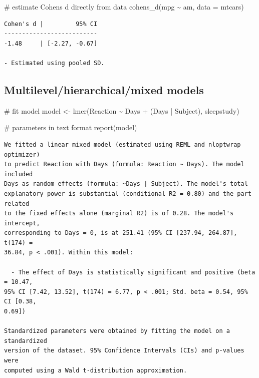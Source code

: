 \documentclass[
  letterpaper,
  DIV=11,
  numbers=noendperiod]{scrreprt}
\newenvironment{Shaded}{\begin{snugshade}}{\end{snugshade}}
\newcommand{\AttributeTok}[1]{\textcolor[rgb]{0.40,0.45,0.13}{#1}}
\newcommand{\CommentTok}[1]{\textcolor[rgb]{0.37,0.37,0.37}{#1}}
\newcommand{\FunctionTok}[1]{\textcolor[rgb]{0.28,0.35,0.67}{#1}}
\newcommand{\NormalTok}[1]{\textcolor[rgb]{0.00,0.23,0.31}{#1}}
\newcommand{\OtherTok}[1]{\textcolor[rgb]{0.00,0.23,0.31}{#1}}
\newcommand{\SpecialCharTok}[1]{\textcolor[rgb]{0.37,0.37,0.37}{#1}}
\begin{document}
\begin{Shaded}
\begin{Highlighting}[]
\CommentTok{\# estimate Cohen\textquotesingle{}s d directly from data}
\FunctionTok{cohens\_d}\NormalTok{(mpg }\SpecialCharTok{\textasciitilde{}}\NormalTok{ am, }\AttributeTok{data =}\NormalTok{ mtcars)}
\end{Highlighting}
\end{Shaded}

\begin{verbatim}
Cohen's d |         95% CI
--------------------------
-1.48     | [-2.27, -0.67]

- Estimated using pooled SD.
\end{verbatim}

\subsection{Multilevel/hierarchical/mixed
models}\label{multilevelhierarchicalmixed-models}

\begin{Shaded}
\begin{Highlighting}[]
\CommentTok{\# fit model}
\NormalTok{model }\OtherTok{\textless{}{-}} \FunctionTok{lmer}\NormalTok{(Reaction }\SpecialCharTok{\textasciitilde{}}\NormalTok{ Days }\SpecialCharTok{+}\NormalTok{ (Days }\SpecialCharTok{|}\NormalTok{ Subject), sleepstudy)}

\CommentTok{\# parameters in text format }
\FunctionTok{report}\NormalTok{(model)}
\end{Highlighting}
\end{Shaded}

\begin{verbatim}
We fitted a linear mixed model (estimated using REML and nloptwrap optimizer)
to predict Reaction with Days (formula: Reaction ~ Days). The model included
Days as random effects (formula: ~Days | Subject). The model's total
explanatory power is substantial (conditional R2 = 0.80) and the part related
to the fixed effects alone (marginal R2) is of 0.28. The model's intercept,
corresponding to Days = 0, is at 251.41 (95% CI [237.94, 264.87], t(174) =
36.84, p < .001). Within this model:

  - The effect of Days is statistically significant and positive (beta = 10.47,
95% CI [7.42, 13.52], t(174) = 6.77, p < .001; Std. beta = 0.54, 95% CI [0.38,
0.69])

Standardized parameters were obtained by fitting the model on a standardized
version of the dataset. 95% Confidence Intervals (CIs) and p-values were
computed using a Wald t-distribution approximation.
\end{verbatim}
\end{document}
